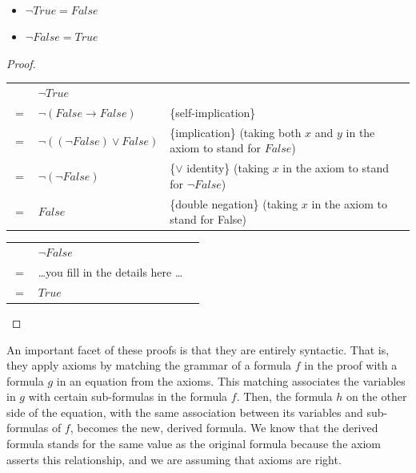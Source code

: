 \begin{theorem}
\mbox{}\\
\begin{itemize}
\item $\neg True = False$
\item $\neg False = True$
\end{itemize}
\end{theorem}
\begin{proof}
\mbox{} \\
\begin{tabular}{llp{3.15in}}
    & $\neg True$                      & \\
$=$ & $\neg (False \rightarrow False)$ & \{self-implication\} \\
$=$ & $\neg ((\neg False) \vee False)$ & \{implication\} (taking both $x$ and $y$ in the axiom to stand for $False$) \\
$=$ & $\neg (\neg False)$              & \{$\vee$ identity\} (taking $x$ in the axiom to stand for $\neg False$) \\
$=$ & $False$                          & \{double negation\} (taking $x$ in the axiom to stand for False) \\
\end{tabular}

\bigskip
\noindent
\begin{tabular}{lll}
    & $\neg False$                             & \\
$=$ & \dots you fill in the details here \dots & \\
$=$ & $True$                                   & \\
\end{tabular}

\end{proof}

An important facet of these proofs is that they are
entirely syntactic. That is, they apply axioms by
matching the grammar of a formula $f$ in the proof with a formula $g$ in an equation from the axioms.
This matching associates the variables in $g$ with certain sub-formulas in the formula $f$.
Then, the formula $h$ on the other side of
the equation, with the same association between its variables and sub-formulas of $f$,
becomes the new, derived formula.
We know that the derived formula stands for the same value
as the original formula because the axiom asserts this relationship,
and we are assuming that axioms are right.

